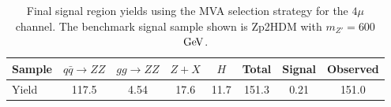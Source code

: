 \begin{table}[htbH]
\begin{center}
\begin{tabular}{ l | c | c | c | c | c | c | c }
\hline
Sample & $q\bar{q} \rightarrow ZZ$ & $gg \rightarrow ZZ$ & $Z+X$ & $H$ & Total & Signal & Observed \\
\hline
Yield & 117.5 & 4.54 & 17.6 & 11.7 & 151.3 & 0.21 & 151.0 \\
\hline
\end{tabular}
\caption{Final signal region yields using the MVA selection strategy for the $4\mu$ channel. The benchmark signal sample shown is Zp2HDM with $m_{Z'}=600$ $\mathrm{Ge\kern -0.1em V}$.}\label{tab:mvayields}
\end{center}
\end{table}




